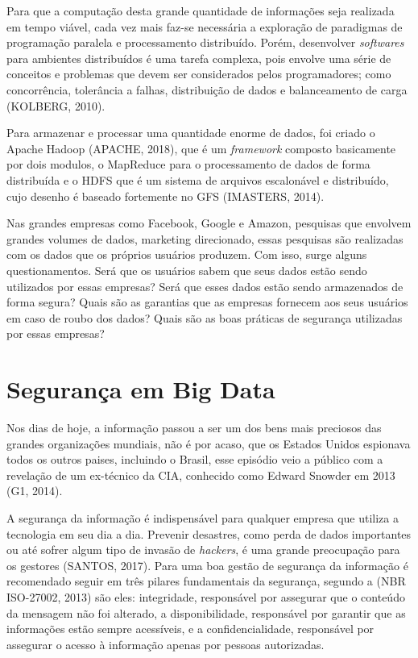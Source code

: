 Para que a computação desta grande quantidade de informações seja realizada em tempo viável, cada vez mais faz-se necessária a exploração de paradigmas de programação paralela e processamento distribuído. Porém, desenvolver \textit{softwares} para ambientes distribuídos é uma tarefa complexa, pois envolve uma série de conceitos e problemas que devem ser considerados pelos programadores; como concorrência, tolerância a falhas, distribuição de dados e balanceamento de carga (KOLBERG, 2010).

Para armazenar e processar uma quantidade enorme de dados, foi criado o Apache Hadoop (APACHE, 2018), que é um \textit{framework} composto basicamente por dois modulos, o MapReduce para o processamento de dados de forma distribuída e o HDFS que é um sistema de arquivos escalonável e distribuído, cujo desenho é baseado fortemente no GFS (IMASTERS, 2014).

Nas grandes empresas como Facebook, Google e Amazon, pesquisas que envolvem grandes volumes de dados, marketing direcionado, essas pesquisas são realizadas com os dados que os próprios usuários produzem. Com isso, surge alguns questionamentos. Será que os usuários sabem que seus dados estão sendo utilizados por essas empresas? Será que esses dados estão sendo armazenados de forma segura? Quais são as garantias que as empresas fornecem aos seus usuários em caso de roubo dos dados? Quais são as boas práticas de segurança utilizadas por essas empresas?

\section{Segurança em Big Data}

Nos dias de hoje, a informação passou a ser um dos bens mais preciosos das grandes organizações mundiais, não é por acaso, que os Estados Unidos espionava todos os outros paises, incluindo o Brasil, esse episódio veio a público com a revelação de um ex-técnico da CIA, conhecido como Edward Snowder em 2013 (G1, 2014).

A segurança da informação é indispensável para qualquer empresa que utiliza a tecnologia em seu dia a dia. Prevenir desastres, como perda de dados importantes ou até sofrer algum tipo de invasão de \textit{hackers}, é uma grande preocupação para os gestores (SANTOS, 2017).
Para uma boa gestão de segurança da informação é recomendado seguir em três pilares fundamentais da segurança, segundo a (NBR ISO-27002, 2013) são eles: integridade, responsável por assegurar que o conteúdo da mensagem não foi alterado, a disponibilidade, responsável por garantir que as informações estão sempre acessíveis, e a confidencialidade, responsável por assegurar o acesso à informação apenas por pessoas autorizadas.



